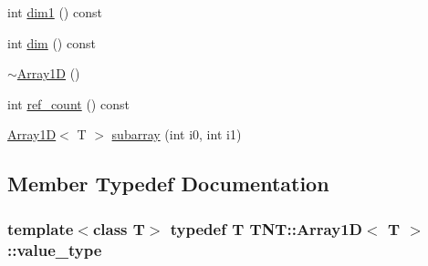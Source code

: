 \begin{DoxyCompactItemize}
\item 
int \hyperlink{classTNT_1_1Array1D_ad0e3ae296c57454d4244f44076cd1e02}{dim1} () const 
\item 
int \hyperlink{classTNT_1_1Array1D_aa1c3e474d22bc02470e0a046b70c1cd1}{dim} () const 
\item 
\hyperlink{classTNT_1_1Array1D_a3d293188a2c4d0dad2075c747a1560c4}{$\sim$\-Array1\-D} ()
\item 
int \hyperlink{classTNT_1_1Array1D_a0704d747a53ae5c231c92abc215f85e0}{ref\-\_\-count} () const 
\item 
\hyperlink{classTNT_1_1Array1D}{Array1\-D}$<$ T $>$ \hyperlink{classTNT_1_1Array1D_a47447dc28a1956e5018953f806192330}{subarray} (int i0, int i1)
\end{DoxyCompactItemize}


\subsection{Member Typedef Documentation}
\hypertarget{classTNT_1_1Array1D_aa33efada6a804a1b32da0e315baeb29c}{
\subsubsection[{value\-\_\-type}]{\setlength{\rightskip}{0pt plus 5cm}template$<$class T$>$ typedef T {\bf T\-N\-T\-::\-Array1\-D}$<$ T $>$\-::{\bf value\-\_\-type}}}\label{classTNT_1_1Array1D_aa33efada6a804a1b32da0e315baeb29c}



